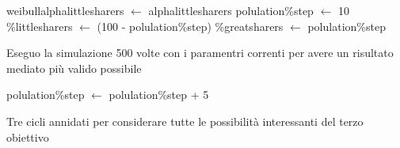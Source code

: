 \begin{algorithm}
 \begin{algorithmic}[1]
      \State weibull\smuscore alpha\smuscore little\smuscore sharers  $\gets$ alpha\smuscore little\smuscore sharers
	\State polulation\smuscore \%\smuscore step $\gets$ 10
	  \State \%\smuscore little\smuscore sharers  $\gets$  (100 - polulation\smuscore \%\smuscore step)
	  \State \%\smuscore great\smuscore sharers  $\gets$  polulation\smuscore \%\smuscore step
	  
	  
	    \Comment Eseguo la simulazione 500 volte con i paramentri correnti per avere un risultato mediato più valido possibile
	  
	  \EndFor
	  
	  \State polulation\smuscore \%\smuscore step $\gets$ polulation\smuscore \%\smuscore step + 5
	  
	\EndWhile
      \EndFor
    \EndProcedure
 \end{algorithmic}
 
 \caption{Tre cicli annidati per considerare tutte le possibilità interessanti del terzo obiettivo}
 \label{alg:third_test}
\end{algorithm}

